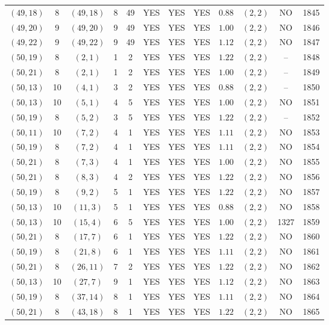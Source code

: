 \begin{longtable}{|c|c|c|c|c|c|c|c|c|c|c|c|}
$(49,18)$ & 8 & $(49,18)$ & 8 & 49 & YES & YES & YES & $0.88$ & $(2,2)$ & NO & 1845\\
$(49,20)$ & 9 & $(49,20)$ & 9 & 49 & YES & YES & YES & $1.00$ & $(2,2)$ & NO & 1846\\
$(49,22)$ & 9 & $(49,22)$ & 9 & 49 & YES & YES & YES & $1.12$ & $(2,2)$ & NO & 1847\\
$(50,19)$ & 8 & $(2,1)$ & 1 & 2 & YES & YES & YES & $1.22$ & $(2,2)$ & -- & 1848\\
$(50,21)$ & 8 & $(2,1)$ & 1 & 2 & YES & YES & YES & $1.00$ & $(2,2)$ & -- & 1849\\
$(50,13)$ & 10 & $(4,1)$ & 3 & 2 & YES & YES & YES & $0.88$ & $(2,2)$ & -- & 1850\\
$(50,13)$ & 10 & $(5,1)$ & 4 & 5 & YES & YES & YES & $1.00$ & $(2,2)$ & NO & 1851\\
$(50,19)$ & 8 & $(5,2)$ & 3 & 5 & YES & YES & YES & $1.22$ & $(2,2)$ & -- & 1852\\
$(50,11)$ & 10 & $(7,2)$ & 4 & 1 & YES & YES & YES & $1.11$ & $(2,2)$ & NO & 1853\\
$(50,19)$ & 8 & $(7,2)$ & 4 & 1 & YES & YES & YES & $1.11$ & $(2,2)$ & NO & 1854\\
$(50,21)$ & 8 & $(7,3)$ & 4 & 1 & YES & YES & YES & $1.00$ & $(2,2)$ & NO & 1855\\
$(50,21)$ & 8 & $(8,3)$ & 4 & 2 & YES & YES & YES & $1.22$ & $(2,2)$ & NO & 1856\\
$(50,19)$ & 8 & $(9,2)$ & 5 & 1 & YES & YES & YES & $1.22$ & $(2,2)$ & NO & 1857\\
$(50,13)$ & 10 & $(11,3)$ & 5 & 1 & YES & YES & YES & $0.88$ & $(2,2)$ & NO & 1858\\
$(50,13)$ & 10 & $(15,4)$ & 6 & 5 & YES & YES & YES & $1.00$ & $(2,2)$ & 1327 & 1859\\
$(50,21)$ & 8 & $(17,7)$ & 6 & 1 & YES & YES & YES & $1.22$ & $(2,2)$ & NO & 1860\\
$(50,19)$ & 8 & $(21,8)$ & 6 & 1 & YES & YES & YES & $1.11$ & $(2,2)$ & NO & 1861\\
$(50,21)$ & 8 & $(26,11)$ & 7 & 2 & YES & YES & YES & $1.22$ & $(2,2)$ & NO & 1862\\
$(50,13)$ & 10 & $(27,7)$ & 9 & 1 & YES & YES & YES & $1.12$ & $(2,2)$ & NO & 1863\\
$(50,19)$ & 8 & $(37,14)$ & 8 & 1 & YES & YES & YES & $1.11$ & $(2,2)$ & NO & 1864\\
$(50,21)$ & 8 & $(43,18)$ & 8 & 1 & YES & YES & YES & $1.22$ & $(2,2)$ & NO & 1865\\

\end{longtable}
